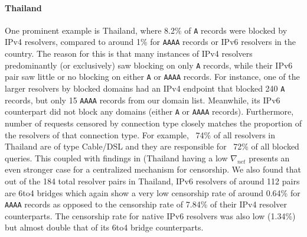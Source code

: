 \paragraph{Thailand} One prominent example is Thailand, where 8.2\% of
\texttt{A} records were blocked by IPv4 resolvers, compared to around 1\% for
\texttt{AAAA} records or IPv6 resolvers in the country. The reason for this is
that many instances of IPv4 resolvers predominantly (or exclusively) saw
blocking on only \texttt{A} records, while their IPv6 pair saw little or no
blocking on either \texttt{A} or \texttt{AAAA} records. For instance, one of the
larger resolvers by blocked domains had an IPv4 endpoint that blocked
240 \texttt{A} records, but only 15 \texttt{AAAA} records from our domain list.
Meanwhile, its IPv6 counterpart did not block any domains (either \texttt{A} or
\texttt{AAAA} records). Furthermore, number of requests censored by connection type
closely matches the proportion of the resolvers of that connection type. For example,
~74\% of all resolvers in Thailand are of type Cable/DSL and they are responsible for
~72\% of all blocked queries. This coupled with findings in 
 (Thailand having a low $\nabla_{net}$ presents an even stronger case for a centralized 
 mechanism for censorship. We also found that out of the 184 total resolver pairs
 in Thailand, IPv6 resolvers of around 112 pairs are 6to4 bridges which again show a 
 very low censorship rate of around 0.64\% for \texttt{AAAA} records as opposed to the 
 censorship rate of 7.84\% of their IPv4 resolver counterparts. The censorship rate
 for native IPv6 resolvers was also low (1.34\%) but almost double that of its 6to4
 bridge counterparts.






